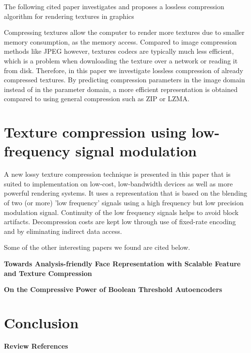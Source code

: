 \documentclass{article}
\begin{document}
The following cited paper investigates and proposes a lossless compression algorithm for rendering textures in graphics

Compressing textures allow the computer to render more textures due to smaller memory consumption, as the memory access. Compared to image compression methods like JPEG however, textures codecs are typically much less efficient, which is a problem when downloading the texture over a network or reading it from disk. Therefore, in this paper we investigate lossless compression of already compressed textures. By predicting compression parameters in the image domain instead of in the parameter domain, a more efficient representation is obtained compared to using general compression such as ZIP or LZMA.

\section{Texture compression using low-frequency signal modulation \cite{10.5555/844174.844187}}

A new lossy texture compression technique is presented in this paper that is suited to implementation on low-cost, low-bandwidth devices as well as more powerful rendering systems. It uses a representation that is based on the blending of two (or more) 'low frequency' signals using a high frequency but low precision modulation signal. Continuity of the low frequency signals helps to avoid block artifacts. Decompression costs are kept low through use of fixed-rate encoding and by eliminating indirect data access.

Some of the other interesting papers we found are cited below.

\textbf{Towards Analysis-friendly Face Representation with Scalable Feature and Texture Compression \cite{wang2020towards}}

\textbf{On the Compressive Power of Boolean Threshold Autoencoders \cite{melkman2020compressive}}

\section{Conclusion}






\textbf{Review References}
\end{document}
